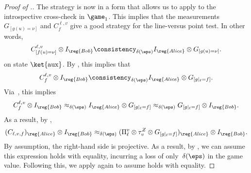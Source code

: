 \begin{proof}[Proof of .]
The strategy is now in a form that allows us to apply 
to the introspective cross-check in $\game_1$.
This implies that the measurements $G_{[g(u) = \nu]}$ and $C^{\ell, v}_f$ give a good strategy for the line-versus point test. In other words,
\begin{equation*}
C^{\ell,v}_{[f(u) = \nu]} \otimes I_{\reg{Bob}} \consistency_{\delta(\eps)} I_{\reg{Alice}} \otimes G_{[g(u)=\nu]}.
\end{equation*}
on state $\ket{\mathrm{aux}}$. By , this implies that
\begin{equation*}
C^{\ell,v}_{f} \otimes I_{\reg{Bob}} \consistency_{\delta(\eps)} I_{\reg{Alice}} \otimes G_{[g|_{\ell} = f]}.
\end{equation*}
Via~, this implies
\begin{equation*}
C^{\ell,v}_{f} \otimes I_{\reg{Bob}}
\approx_{\delta(\eps)} I_{\reg{Alice}} \otimes G_{[g|_{\ell} = f]}
\approx_{\delta(\eps)} G_{[g|_{\ell} = f]} \otimes I_{\reg{Bob}}.
\end{equation*}
As a result, by ,
\begin{equation*}
(C_{\ell, v, f})_{\reg{Alice}} \otimes I_{\reg{Bob}} \approx_{\delta(\eps)} (\Pi_{\ell}^v \otimes \tau_v^Z \otimes G_{[g|_{\ell}=f]})_{\reg{Alice}} \otimes I_{\reg{Bob}}.
\end{equation*}
By assumption, the right-hand side is projective.
As a result, by , we can assume this expression holds with equality, incurring a loss of only~$\delta(\eps)$ in the game value.
Following this, we apply  again to assume  holds with equality.


\end{proof}
